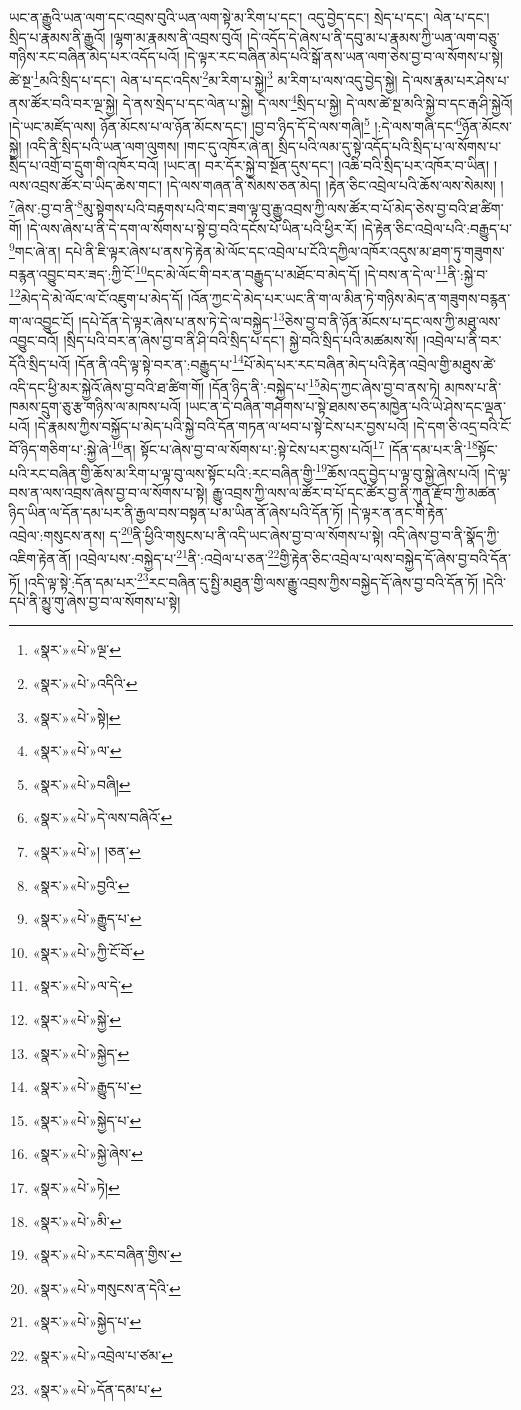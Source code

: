 ཡང་ན་རྒྱུའི་ཡན་ལག་དང་འབྲས་བུའི་ཡན་ལག་སྟེ་མ་རིག་པ་དང་། འདུ་བྱེད་དང་། སྲེད་པ་དང་། ལེན་པ་དང་། སྲིད་པ་རྣམས་ནི་རྒྱུའོ། །ལྷག་མ་རྣམས་ནི་འབྲས་བུའོ། །དེ་འདོད་དེ་ཞེས་པ་ནི་དབུ་མ་པ་རྣམས་ཀྱི་ཡན་ལག་བཅུ་གཉིས་རང་བཞིན་མེད་པར་འདོད་པའོ། །དེ་ལྟར་རང་བཞིན་མེད་པའི་སྒོ་ནས་ཡན་ལག་ཅེས་བྱ་བ་ལ་སོགས་པ་སྟེ། ཚེ་སྔ་\footnote{«སྣར་»«པེ་»ལྔ་}མའི་སྲིད་པ་དང་། ལེན་པ་དང་འདིས་\footnote{«སྣར་»«པེ་»འདིའི་}མ་རིག་པ་སྐྱེ།\footnote{«སྣར་»«པེ་»སྟེ།} མ་རིག་པ་ལས་འདུ་བྱེད་སྐྱེ། དེ་ལས་རྣམ་པར་ཤེས་པ་ནས་ཚོར་བའི་བར་ལྔ་སྐྱེ། དེ་ནས་སྲེད་པ་དང་ལེན་པ་སྐྱེ། དེ་ལས་\footnote{«སྣར་»«པེ་»ལ་}སྲིད་པ་སྐྱེ། དེ་ལས་ཚེ་སྔ་མའི་སྐྱེ་བ་དང་རྒ་ཤི་སྐྱེའོ། །དེ་ཡང་མཛོད་ལས། ཉོན་མོངས་པ་ལ་ཉོན་མོངས་དང་། །བྱ་བ་ཉིད་དོ་དེ་ལས་གཞི།\footnote{«སྣར་»«པེ་»བཞི།} །:དེ་ལས་གཞི་དང་\footnote{«སྣར་»«པེ་»དེ་ལས་བཞིའོ་}ཉོན་མོངས་སྐྱེ། །འདི་ནི་སྲིད་པའི་ཡན་ལག་ལུགས། །གང་དུ་འཁོར་ཞེ་ན། སྲིད་པའི་ལམ་དུ་སྟེ་འདོད་པའི་སྲིད་པ་ལ་སོགས་པ་སྲིད་པ་འགྲོ་བ་དྲུག་གི་འཁོར་བའོ། །ཡང་ན། བར་དོར་སྐྱེ་བ་སྔོན་དུས་དང་། །འཆི་བའི་སྲིད་པར་འཁོར་བ་ཡིན། །ལས་འབྲས་ཚོར་བ་ཡིད་ཆེས་གང་། །དེ་ལས་གཞན་ནི་སེམས་ཅན་མེད། །རྟེན་ཅིང་འབྲེལ་པའི་ཆོས་ལས་སེམས། །\footnote{«སྣར་»«པེ་»། །ཅན་}ཞེས་:བྱ་བ་ནི་\footnote{«སྣར་»«པེ་»བྱའི་}མུ་སྟེགས་པའི་བརྟགས་པའི་གང་ཟག་ལྟ་བུ་རྒྱུ་འབྲས་ཀྱི་ལས་ཚོར་བ་པོ་མེད་ཅེས་བྱ་བའི་ཐ་ཚིག་གོ། །དེ་ལས་ཞེས་པ་ནི་དེ་དག་ལ་སོགས་པ་སྟེ་བྱ་བའི་དངོས་པོ་ཡིན་པའི་ཕྱིར་རོ། །དེ་རྟེན་ཅིང་འབྲེལ་པའི་:བརྒྱུད་པ་\footnote{«སྣར་»«པེ་»རྒྱུད་པ་}གང་ཞེ་ན། དཔེ་ནི་ཇི་ལྟར་ཞེས་པ་ནས་ཏེ་རྟེན་མེ་ལོང་དང་འབྲེལ་པ་ངོའི་དཀྱིལ་འཁོར་འདུས་མ་ཐག་ཏུ་གཟུགས་བརྙན་འབྱུང་བར་ཟད་:ཀྱི་ངོ་\footnote{«སྣར་»«པེ་»ཀྱི་ངོ་བོ་}དང་མེ་ལོང་གི་བར་ན་བརྒྱུད་པ་མཐོང་བ་མེད་དོ། །དེ་བས་ན་དེ་ལ་\footnote{«སྣར་»«པེ་»ལ་དེ་}ནི་:སྐྱེ་བ་\footnote{«སྣར་»«པེ་»སྐྱེ་}མེད་དེ་མེ་ལོང་ལ་ངོ་འཇུག་པ་མེད་དོ། །འོན་ཀྱང་དེ་མེད་པར་ཡང་ནི་ག་ལ་མིན་ཏེ་གཉིས་མེད་ན་གཟུགས་བརྙན་ག་ལ་འབྱུང་ངོ། །དཔེ་དོན་དེ་ལྟར་ཞེས་པ་ནས་ཏེ་དེ་ལ་བསྐྱེད་\footnote{«སྣར་»«པེ་»སྐྱེད་}ཅེས་བྱ་བ་ནི་ཉོན་མོངས་པ་དང་ལས་ཀྱི་མཐུ་ལས་འབྱུང་བའོ། །སྲིད་པའི་བར་ན་ཞེས་བྱ་བ་ནི་ཤི་བའི་སྲིད་པ་དང་། སྐྱེ་བའི་སྲིད་པའི་མཚམས་སོ། །འབྲེལ་པ་ནི་བར་དོའི་སྲིད་པའོ། །དོན་ནི་འདི་ལྟ་སྟེ་བར་ན་:བརྒྱུད་པ་\footnote{«སྣར་»«པེ་»རྒྱུད་པ་}པོ་མེད་པར་རང་བཞིན་མེད་པའི་རྟེན་འབྲེལ་གྱི་མཐུས་ཚེ་འདི་དང་ཕྱི་མར་སྐྱེའོ་ཞེས་བྱ་བའི་ཐ་ཚིག་གོ། །དོན་ཉིད་ནི་:བསྐྱེད་པ་\footnote{«སྣར་»«པེ་»སྐྱེད་པ་}མེད་ཀྱང་ཞེས་བྱ་བ་ནས་ཏེ། མཁས་པ་ནི་ཁམས་དྲུག་ཅུ་རྩ་གཉིས་ལ་མཁས་པའོ། །ཡང་ན་དེ་བཞིན་གཤེགས་པ་སྟེ་ཐམས་ཅད་མཁྱེན་པའི་ཡེ་ཤེས་དང་ལྡན་པའོ། །དེ་རྣམས་ཀྱིས་བསྐྱོད་པ་མེད་པའི་སྐྱེ་བའི་དོན་གཏན་ལ་ཕབ་པ་སྟེ་ངེས་པར་བྱས་པའོ། །དེ་དག་ཅི་འདྲ་བའི་ངོ་བོ་ཉིད་གཅིག་པ་:སྐྱེ་ཞེ་\footnote{«སྣར་»«པེ་»སྐྱེ་ཞེས་}ན། སྟོང་པ་ཞེས་བྱ་བ་ལ་སོགས་པ་:སྟེ་ངེས་པར་བྱས་པའོ།\footnote{«སྣར་»«པེ་»ཏེ།} །དོན་དམ་པར་ནི་\footnote{«སྣར་»«པེ་»མི་}སྟོང་པའི་རང་བཞིན་གྱི་ཆོས་མ་རིག་པ་ལྟ་བུ་ལས་སྟོང་པའི་:རང་བཞིན་གྱི་\footnote{«སྣར་»«པེ་»རང་བཞིན་གྱིས་}ཆོས་འདུ་བྱེད་པ་ལྟ་བུ་སྐྱེ་ཞེས་པའོ། །དེ་ལྟ་བས་ན་ལས་འབྲས་ཞེས་བྱ་བ་ལ་སོགས་པ་སྟེ། རྒྱུ་འབྲས་ཀྱི་ལས་ལ་ཚོར་བ་པོ་དང་ཚོར་བྱ་ནི་ཀུན་རྫོབ་ཀྱི་མཚན་ཉིད་ཡིན་ལ་དོན་དམ་པར་ནི་རྒྱལ་བས་བསྟན་པ་མ་ཡིན་ནོ་ཞེས་པའི་དོན་ཏོ། །དེ་ལྟར་ན་ནང་གི་རྟེན་འབྲེལ་:གསུངས་ནས། ད་\footnote{«སྣར་»«པེ་»གསུངས་ན་དེའི་}ནི་ཕྱིའི་གསུངས་པ་ནི་འདི་ཡང་ཞེས་བྱ་བ་ལ་སོགས་པ་སྟེ། འདི་ཞེས་བྱ་བ་ནི་སྣོད་ཀྱི་འཇིག་རྟེན་ནོ། །འབྲེལ་པས་:བསྐྱེད་པ་\footnote{«སྣར་»«པེ་»སྐྱེད་པ་}ནི་:འབྲེལ་པ་ཅན་\footnote{«སྣར་»«པེ་»འབྲེལ་པ་ཙམ་}གྱི་རྟེན་ཅིང་འབྲེལ་པ་ལས་བསྐྱེད་དོ་ཞེས་བྱ་བའི་དོན་ཏོ། །འདི་ལྟ་སྟེ་:དོན་དམ་པར་\footnote{«སྣར་»«པེ་»དོན་དམ་པ་}རང་བཞིན་དུ་སྤྱི་མཐུན་གྱི་ལས་རྒྱུ་འབྲས་ཀྱིས་བསྐྱེད་དོ་ཞེས་བྱ་བའི་དོན་ཏོ། །དེའི་དཔེ་ནི་མྱུ་གུ་ཞེས་བྱ་བ་ལ་སོགས་པ་སྟེ། 